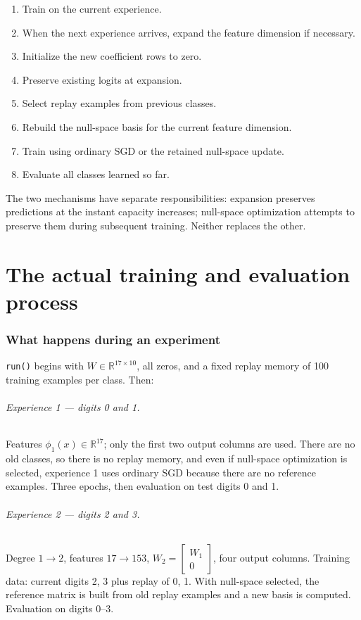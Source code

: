 \documentclass[11pt,a4paper]{article}
\newcommand{\R}{\mathbb{R}}
\newcommand{\code}[1]{\texttt{#1}}
\begin{document}
\begin{enumerate}
\item Train on the current experience.
\item When the next experience arrives, expand the feature dimension if necessary.
\item Initialize the new coefficient rows to zero.
\item Preserve existing logits at expansion.
\item Select replay examples from previous classes.
\item Rebuild the null-space basis for the current feature dimension.
\item Train using ordinary SGD or the retained null-space update.
\item Evaluate all classes learned so far.
\end{enumerate}
The two mechanisms have separate responsibilities: expansion preserves predictions at the instant capacity increases; null-space optimization attempts to preserve them during subsequent training. Neither replaces the other.

\part{The actual training and evaluation process}

\section{What happens during an experiment}

\code{run()} begins with $W\in\R^{17\times10}$, all zeros, and a fixed replay memory of 100 training examples per class. Then:

\paragraph{Experience 1 --- digits 0 and 1.} Features $\phi_1(x)\in\R^{17}$; only the first two output columns are used. There are no old classes, so there is no replay memory, and even if null-space optimization is selected, experience 1 uses ordinary SGD because there are no reference examples. Three epochs, then evaluation on test digits 0 and 1.

\paragraph{Experience 2 --- digits 2 and 3.} Degree $1\to2$, features $17\to153$, $W_2=\begin{bmatrix}W_1\\0\end{bmatrix}$, four output columns. Training data: current digits 2, 3 plus replay of 0, 1. With null-space selected, the reference matrix is built from old replay examples and a new basis is computed. Evaluation on digits 0--3.
\end{document}

